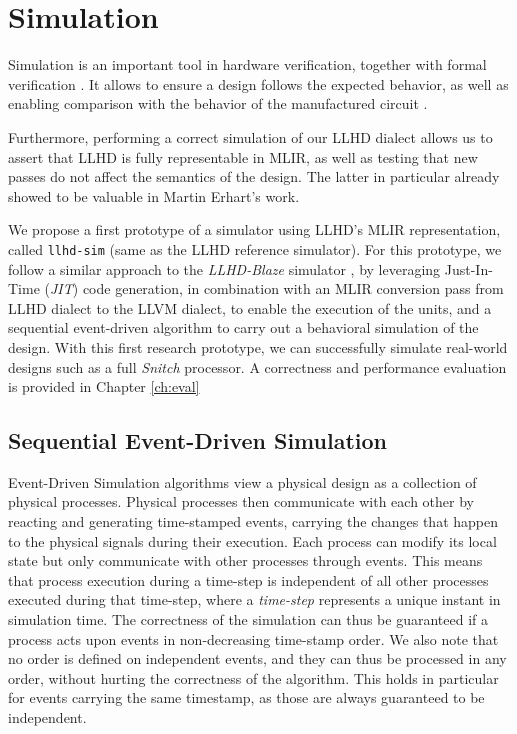 
\chapter{Simulation}
\label{ch:sim}

Simulation is an important tool in hardware verification, together with formal verification \cite{YuanLu2001, Kumar1998}. It allows to ensure a design follows the expected behavior, as well as enabling comparison with the behavior of the manufactured circuit \cite{Ashenden1994}.

Furthermore, performing a correct simulation of our LLHD dialect allows us to assert that LLHD is fully representable in MLIR, as well as testing that new passes do not affect the semantics of the design. The latter in particular already showed to be valuable in Martin Erhart's work.

We propose a first prototype of a simulator using LLHD's MLIR representation, called \texttt{llhd-sim} (same as the LLHD reference simulator). For this prototype, we follow a similar approach to the \textit{LLHD-Blaze} simulator \cite{Schuiki2020}, by leveraging Just-In-Time (\textit{JIT}) code generation, in combination with an MLIR conversion pass from LLHD dialect to the LLVM dialect, to enable the execution of the units, and a sequential event-driven algorithm to carry out a behavioral simulation of the design. With this first research prototype, we can successfully simulate real-world designs such as a full \textit{Snitch} \cite{Zaruba2020} processor. A correctness and performance evaluation is provided in Chapter \ref{ch:eval}


\section{Sequential Event-Driven Simulation}
Event-Driven Simulation algorithms \cite{Ashenden1994} view a physical design as a collection of physical processes. Physical processes then communicate with each other by reacting and generating time-stamped events, carrying the changes that happen to the physical signals during their execution. Each process can modify its local state but only communicate with other processes through events. This means that process execution during a time-step is independent of all other processes executed during that time-step, where a \textit{time-step} represents a unique instant in simulation time. The correctness of the simulation can thus be guaranteed if a process acts upon events in non-decreasing time-stamp order. We also note that no order is defined on independent events, and they can thus be processed in any order, without hurting the correctness of the algorithm. This holds in particular for events carrying the same timestamp, as those are always guaranteed to be independent.

